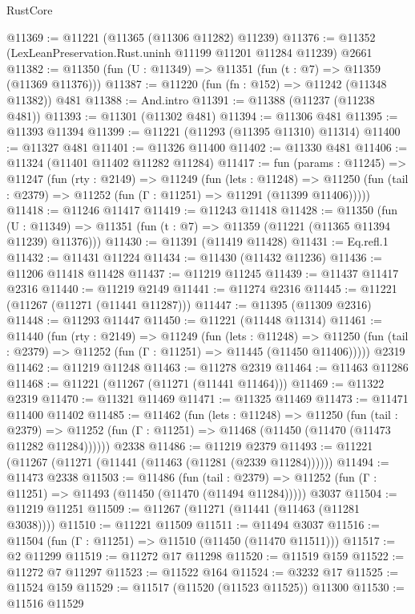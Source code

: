 \begin{lexlean}{RustCore}
\begin{coremodule}
@11369 := @11221 (@11365 (@11306 @11282) @11239)
@11376 := @11352 (LexLeanPreservation.Rust.uninh @11199 @11201 @11284 @11239) @2661
@11382 := @11350 (fun (U : @11349) => @11351 (fun (t : @7) => @11359 (@11369 @11376)))
@11387 := @11220 (fun (fn : @152) => @11242 (@11348 @11382)) @481
@11388 := And.intro
@11391 := @11388 (@11237 (@11238 @481))
@11393 := @11301 (@11302 @481)
@11394 := @11306 @481
@11395 := @11393 @11394
@11399 := @11221 (@11293 (@11395 @11310) @11314)
@11400 := @11327 @481
@11401 := @11326 @11400
@11402 := @11330 @481
@11406 := @11324 (@11401 @11402 @11282 @11284)
@11417 := fun (params : @11245) =>
  @11247
    (fun (rty : @2149) =>
    @11249
      (fun (lets : @11248) =>
      @11250 (fun (tail : @2379) => @11252 (fun (Γ : @11251) => @11291 (@11399 @11406)))))
@11418 := @11246 @11417
@11419 := @11243 @11418
@11428 := @11350
    (fun (U : @11349) => @11351 (fun (t : @7) => @11359 (@11221 (@11365 @11394 @11239) @11376)))
@11430 := @11391 (@11419 @11428)
@11431 := Eq.refl.{1}
@11432 := @11431 @11224
@11434 := @11430 (@11432 @11236)
@11436 := @11206 @11418 @11428
@11437 := @11219 @11245
@11439 := @11437 @11417 @2316
@11440 := @11219 @2149
@11441 := @11274 @2316
@11445 := @11221 (@11267 (@11271 (@11441 @11287)))
@11447 := @11395 (@11309 @2316)
@11448 := @11293 @11447
@11450 := @11221 (@11448 @11314)
@11461 := @11440
    (fun (rty : @2149) =>
    @11249
      (fun (lets : @11248) =>
      @11250 (fun (tail : @2379) => @11252 (fun (Γ : @11251) => @11445 (@11450 @11406)))))
    @2319
@11462 := @11219 @11248
@11463 := @11278 @2319
@11464 := @11463 @11286
@11468 := @11221 (@11267 (@11271 (@11441 @11464)))
@11469 := @11322 @2319
@11470 := @11321 @11469
@11471 := @11325 @11469
@11473 := @11471 @11400 @11402
@11485 := @11462
    (fun (lets : @11248) =>
    @11250
      (fun (tail : @2379) =>
      @11252 (fun (Γ : @11251) => @11468 (@11450 (@11470 (@11473 @11282 @11284))))))
    @2338
@11486 := @11219 @2379
@11493 := @11221 (@11267 (@11271 (@11441 (@11463 (@11281 (@2339 @11284))))))
@11494 := @11473 @2338
@11503 := @11486
    (fun (tail : @2379) => @11252 (fun (Γ : @11251) => @11493 (@11450 (@11470 (@11494 @11284)))))
    @3037
@11504 := @11219 @11251
@11509 := @11267 (@11271 (@11441 (@11463 (@11281 @3038))))
@11510 := @11221 @11509
@11511 := @11494 @3037
@11516 := @11504 (fun (Γ : @11251) => @11510 (@11450 (@11470 @11511)))
@11517 := @2 @11299
@11519 := @11272 @17 @11298
@11520 := @11519 @159
@11522 := @11272 @7 @11297
@11523 := @11522 @164
@11524 := @3232 @17
@11525 := @11524 @159
@11529 := @11517 (@11520 (@11523 @11525)) @11300
@11530 := @11516 @11529

\end{coremodule}
\end{lexlean}
